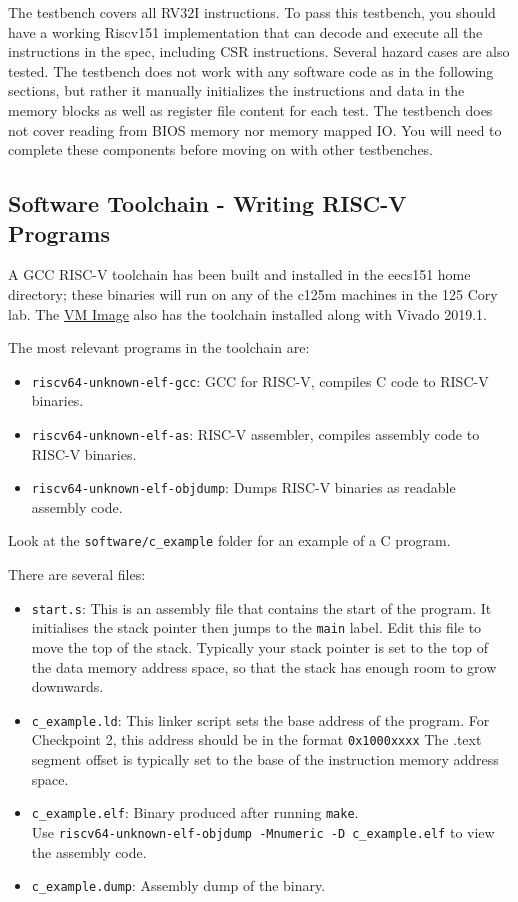 \documentclass[11pt]{article}
\begin{document}
The testbench covers all RV32I instructions. To pass this testbench, you should have a working Riscv151 implementation that can decode and execute all the instructions in the spec, including CSR instructions. Several hazard cases are also tested. The testbench does not work with any software code as in the following sections, but rather it manually initializes the instructions and data in the memory blocks as well as register file content for each test. The testbench does not cover reading from BIOS memory nor memory mapped IO. You will need to complete these components before moving on with other testbenches.

\subsection{Software Toolchain - Writing RISC-V Programs}
\label{toolchain}
A GCC RISC-V toolchain has been built and installed in the eecs151 home directory; these binaries will run on any of the c125m machines in the 125 Cory lab. The \href{https://berkeley.box.com/s/s4z0ykpf0tudrm9hce8fsmitpgb2khhe}{VM Image} also has the toolchain installed along with Vivado 2019.1.

The most relevant programs in the toolchain are:
\begin{itemize}
    \item \verb|riscv64-unknown-elf-gcc|: GCC for RISC-V, compiles C code to RISC-V binaries.
    \item \verb|riscv64-unknown-elf-as|: RISC-V assembler, compiles assembly code to RISC-V binaries.
    \item \verb|riscv64-unknown-elf-objdump|: Dumps RISC-V binaries as readable assembly code.
\end{itemize}

Look at the \verb|software/c_example| folder for an example of a C program.

There are several files:
\begin{itemize}
    \item \verb|start.s|: This is an assembly file that contains the start of the program.
      It initialises the stack pointer then jumps to the \verb|main| label.
      Edit this file to move the top of the stack.
      Typically your stack pointer is set to the top of the data memory address space, so that the stack has enough room to grow downwards.

    \item \verb|c_example.ld|: This linker script sets the base address of the program.
      For Checkpoint 2, this address should be in the format \verb|0x1000xxxx|
      The .text segment offset is typically set to the base of the instruction memory address space.

    \item \verb|c_example.elf|: Binary produced after running \verb|make|.\\Use \verb|riscv64-unknown-elf-objdump -Mnumeric -D c_example.elf| to view the assembly code.
    \item \verb|c_example.dump|: Assembly dump of the binary.
\end{itemize}
\end{document}
